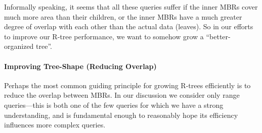 Informally speaking, it seems that all these queries suffer if the inner MBRs cover much more area than their children, or the inner MBRs have a much greater degree of overlap with each other than the actual data (leaves).
So in our efforts to improve our R-tree performance, we want to somehow grow a ``better-organized tree''.





\paragraph{Improving Tree-Shape (Reducing Overlap)}
Perhaps the most common guiding principle for growing R-trees efficiently is to reduce the overlap between MBRs.
In our discussion we consider only range queries---this is both one of the few queries for which we have a strong understanding, and is fundamental enough to reasonably hope its efficiency influences more complex queries.

